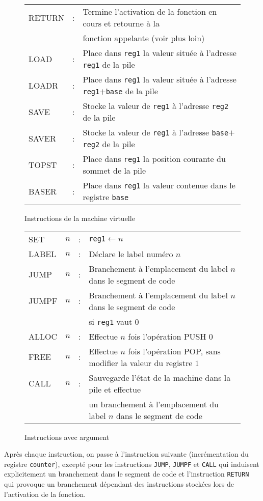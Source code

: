 \documentclass[12pt,a4paper]{article}
\begin{document}
\begin{figure}
\begin{tabular}{lll}
    RETURN&:& Termine l'activation de la fonction en cours
    et retourne à la\\&& fonction appelante (voir plus loin)\\
    LOAD &:& Place dans \texttt{reg1} la valeur située à l'adresse \texttt{reg1}
    de la pile\\
    LOADR &:& Place dans \texttt{reg1} la valeur située à l'adresse
    \texttt{reg1}$+$\texttt{base} de la pile\\
    SAVE &:& Stocke la valeur de \texttt{reg1} à l'adresse \texttt{reg2} de la pile\\
    SAVER&:& Stocke la valeur de \texttt{reg1} à l'adresse \texttt{base}$+$\texttt{reg2} de la pile\\
    TOPST &:& Place dans \texttt{reg1} la position courante du sommet de la pile\\
    BASER &:& Place dans \texttt{reg1} la valeur contenue dans le registre \texttt{base}\\
  \end{tabular}
  \caption{Instructions de la machine virtuelle}
  \label{fig:instruct}
\end{figure}

\begin{figure}
  \centering
  \begin{tabular}{llll}
    SET   &$n$&:& \texttt{reg1}$\leftarrow n$\\
    LABEL &$n$&:& Déclare le label numéro $n$\\
    JUMP  &$n$&:& Branchement à l'emplacement du label $n$ dans le segment de code\\
    JUMPF &$n$&:& Branchement à l'emplacement du label $n$ dans le segment de code\\
    &&& si \texttt{reg1} vaut $0$\\
    ALLOC &$n$&:& Effectue $n$ fois l'opération PUSH $0$ \\
    FREE  &$n$&:& Effectue $n$ fois l'opération POP, sans modifier la valeur du registre $1$\\
    CALL  &$n$&:& Sauvegarde l'état de la machine dans la pile et effectue \\
    &&& un branchement à l'emplacement du label $n$ dans le segment de code\\
  \end{tabular}
  \caption{Instructions avec argument}
\label{fig:instructarg}
\end{figure}

Après chaque instruction, on passe à l'instruction suivante
(incrémentation du registre \texttt{counter}), excepté
pour les instructions \texttt{JUMP}, \texttt{JUMPF} et \texttt{CALL} qui
induisent explicitement un branchement dans le segment de code
et l'instruction \texttt{RETURN} qui provoque un branchement dépendant
des instructions stockées lors de l'activation de la fonction.
\end{document}
